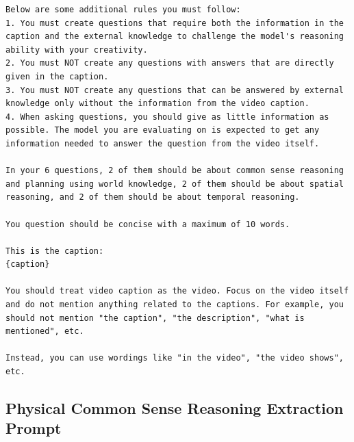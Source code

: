 \begin{tcolorbox}[colback=nvidiagreen!3,colframe=nvidiagreen!75!white,title=\textsc{Physical Common Sense Question-Construction Prompt},left=0.5ex,right=0.5ex,top=0.5ex,bottom=0.5ex]
\begin{Verbatim}[breaklines=true, breaksymbolleft={}, breaksymbolright={}]
Below are some additional rules you must follow:
1. You must create questions that require both the information in the caption and the external knowledge to challenge the model's reasoning ability with your creativity.
2. You must NOT create any questions with answers that are directly given in the caption.
3. You must NOT create any questions that can be answered by external knowledge only without the information from the video caption.
4. When asking questions, you should give as little information as possible. The model you are evaluating on is expected to get any information needed to answer the question from the video itself.

In your 6 questions, 2 of them should be about common sense reasoning and planning using world knowledge, 2 of them should be about spatial reasoning, and 2 of them should be about temporal reasoning.

You question should be concise with a maximum of 10 words.

This is the caption:
{caption}

You should treat video caption as the video. Focus on the video itself and do not mention anything related to the captions. For example, you should not mention "the caption", "the description", "what is mentioned", etc.

Instead, you can use wordings like "in the video", "the video shows", etc.
\end{Verbatim}
\label{prompt:commonsense_reasoning_question_construction}
\end{tcolorbox}


\subsection{Physical Common Sense Reasoning Extraction Prompt}

